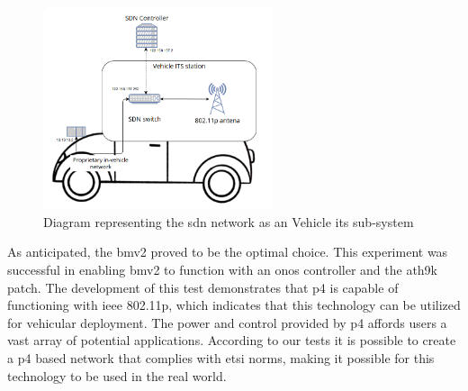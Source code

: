 \begin{figure}
	\centering
	\includegraphics[width=0.6\textwidth]{Chapters/Figures/tests/bmv2_phase_2/its_vehicle_diagram.PNG}
	\caption{Diagram representing the \gls{sdn} network as an Vehicle \gls{its} sub-system}
	\label{fig:exp2_vehicle_subsystem}
\end{figure}

As anticipated, the \gls{bmv2} proved to be the optimal choice. This experiment was successful in enabling \gls{bmv2} to function with an \gls{onos} controller and the ath9k patch. The development of this test demonstrates that \gls{p4} is capable of functioning with \gls{ieee} 802.11p, which indicates that this technology can be utilized for vehicular deployment. The power and control provided by \gls{p4} affords users a vast array of potential applications. According to our tests it is possible to create a \gls{p4} based network that complies with \gls{etsi} norms, making it possible for this technology to be used in the real world.

